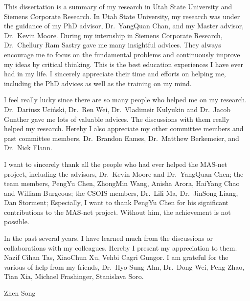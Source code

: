 \begin{acknowledgements}
    This dissertation is a summary of my research in Utah State University and Siemens Corporate Research. In Utah State University, my research was under the guidance of my PhD advisor, Dr.~YangQuan Chan, and my Master advisor, Dr.~Kevin Moore. During my internship in Siemens Corporate Research, Dr.~Chellury Ram Sastry gave me many insightful advices. They always encourage me to focus on the fundamental problems and continuously improve my ideas by critical thinking. This is the best education experiences I have ever had in my life. I sincerely appreciate their time and efforts on helping me, including the PhD advices as well as the training on my mind.

    I feel really lucky since there are so many people who helped me on my research. Dr.~Dariusz Uci\'{n}ski, Dr.~Ren Wei, Dr.~Vladimeir Kulyukin and Dr.~Jacob Gunther gave me lots of valuable advices. The discussions with them really helped my research. Hereby I also appreciate my other committee members and past committee members, Dr.~Brandon Eames, Dr.~Matthew Berkemeier, and Dr.~Nick Flann.

    I want to sincerely thank all the people who had ever helped the MAS-net project, including the advisors, Dr.~Kevin Moore and Dr.~YangQuan Chen; the team members, PengYu Chen, ZhongMin Wang, Anisha Arora, HaiYang Chao and William Burgeous; the CSOIS members, Dr.~Lili Ma, Dr.~JinSong Liang, Dan Storment; Especially, I want to thank PengYu Chen for his significant contributions to the MAS-net project. Without him, the achievement is not possible.

    In the past several years, I have learned much from the discussions or collaborations with my colleagues. Hereby I present my appreciation to them. Nazif Cihan Tas, XiaoChun Xu, Vehbi Cagri Gungor. I am grateful for the various of help from my friends, Dr.~Hyo-Sung Ahn, Dr.~Dong Wei, Peng Zhao, Tian Xia, Michael Frashinger, Stanislava Soro.

\vspace{.2in}
\hfill Zhen Song
\end{acknowledgements}



